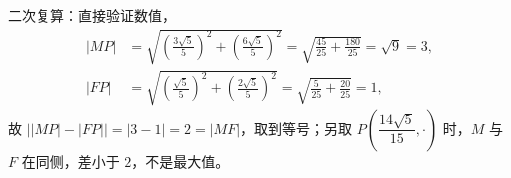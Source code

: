 \begin{answer}
二次复算：直接验证数值，
\nopagebreak[4]
\[
\begin{aligned}
|MP|&=\sqrt{\left(\frac{3\sqrt5}{5}\right)^2+\left(\frac{6\sqrt5}{5}\right)^2}=\sqrt{\frac{45}{25}+\frac{180}{25}}=\sqrt9=3,\\
|FP|&=\sqrt{\left(\frac{\sqrt5}{5}\right)^2+\left(\frac{2\sqrt5}{5}\right)^2}=\sqrt{\frac{5}{25}+\frac{20}{25}}=1,
\end{aligned}
\]
故 $\bigl||MP|-|FP|\bigr|=|3-1|=2=|MF|$，取到等号；另取 $P\left(\dfrac{14\sqrt5}{15},\cdot\right)$ 时，$M$ 与 $F$ 在同侧，差小于 $2$，不是最大值。



\end{answer}
